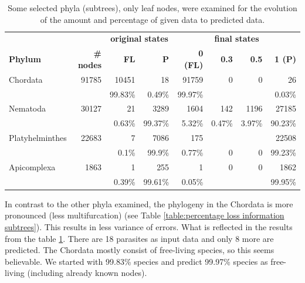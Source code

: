       \begin{table}
        \begin{center}
          \begin{tabular}{ |l|r||r|r||r|r|r|r| }
            \hline
            & & \multicolumn{2}{c||}{\bfseries original states} & \multicolumn{4}{c|}{\bfseries final states} \\
            \bfseries Phylum & \bfseries \# nodes & \bfseries FL & \bfseries P & \bfseries 0 \bfseries (FL) & \bfseries 0.3 &\bfseries  0.5 & \bfseries 1 (P) \\
            \hline \hline
            Chordata & 91785        & 10451 & 18          & 91759 & 0 & 0 & 26 \\
            &                       & 99.83\% & 0.49\%  & 99.97\% & & & 0.03\% \\ \hline
            Nematoda & 30127        & 21 & 3289           & 1604 & 142 & 1196 & 27185 \\
            &                       & 0.63\% & 99.37\%  & 5.32\% & 0.47\% & 3.97\% & 90.23\% \\ \hline
            Platyhelminthes & 22683 & 7 & 7086            & 175 & & & 22508 \\
            &                       & 0.1\% & 99.9\%    & 0.77\% & 0 & 0 & 99.23\% \\ \hline
            Apicomplexa & 1863      & 1 & 255             & 1 & 0 & 0 & 1862 \\
            &                       & 0.39\% & 99.61\%  & 0.05\% & & & 99.95\% \\
            \hline
          \end{tabular} 
        \end{center}
        \caption{Some selected phyla (subtrees), only leaf nodes, were examined for the evolution 
          of the amount and percentage of given data to predicted data.}
        \label{table:phylum leaf nodes states} 
      \end{table}

      In contrast to the other phyla examined, the phylogeny in the Chordata is more pronounced (less 
        multifurcation) (see Table \ref{table:percentage loss information subtrees}). This results in 
        less variance of errors. What is reflected in the results from the table 
        \ref{table:phylum leaf nodes states}. There are 18 parasites as input data and only 8 more are 
        predicted. The Chordata mostly consist of free-living species, so this seems believable. We 
        started with 99.83\%  species and predict 99.97\% species as free-living (including already 
        known nodes).

